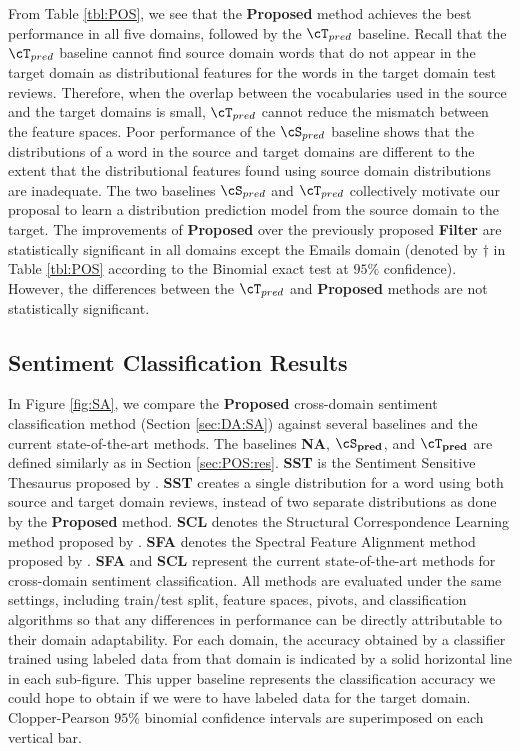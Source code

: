 \documentclass[11pt]{article}
\begin{document}
From Table \ref{tbl:POS}, we see that the \textbf{Proposed} method achieves the best performance in all five domains,
followed by the $\cT_{pred}$ baseline. 
Recall that the $\cT_{pred}$ baseline cannot find source domain words that do not appear in the target domain
as distributional features for the words in the target domain test reviews. Therefore, when the overlap between 
the vocabularies used in the source and the target domains is small, $\cT_{pred}$ cannot reduce the mismatch between the feature spaces.
Poor performance of the $\cS_{pred}$ baseline shows that the distributions of a word in the source and target domains
are different to the extent that the distributional features found using source domain distributions are inadequate.
The two baselines $\cS_{pred}$ and $\cT_{pred}$ collectively motivate our
proposal to learn a distribution prediction model from the source domain to the target.
The improvements of \textbf{Proposed}  over the previously proposed
\textbf{Filter} are statistically significant in all domains except the Emails domain (denoted by $\dagger$
in Table \ref{tbl:POS} according to the Binomial exact test at $95\%$ confidence). 
However, the differences between the $\cT_{pred}$ and
\textbf{Proposed} methods are not statistically significant.

\subsection{Sentiment Classification Results}
\label{sec:SA:res}

In Figure \ref{fig:SA}, we compare the \textbf{Proposed} 
cross-domain sentiment classification method (Section \ref{sec:DA:SA})
against several baselines and the current state-of-the-art methods.
The baselines \textbf{NA}, $\mathbf{\cS_{pred}}$, 
and $\mathbf{\cT_{pred}}$ are defined similarly as in Section \ref{sec:POS:res}.
\textbf{SST} is the Sentiment Sensitive Thesaurus proposed by . 
\textbf{SST} creates a single distribution for a word using both source and target domain reviews,
instead of two separate distributions as done by the \textbf{Proposed} method.
\textbf{SCL} denotes the Structural Correspondence Learning method proposed by .
\textbf{SFA} denotes the Spectral Feature Alignment 
method proposed by .
\textbf{SFA} and \textbf{SCL} represent  the current state-of-the-art methods for 
cross-domain sentiment classification.
All methods are evaluated under the same settings, including train/test split, feature spaces, pivots, and classification algorithms
so that any differences in performance can be directly attributable to their domain adaptability.
For each domain, the accuracy obtained by a classifier trained using labeled data from that domain
is indicated by a solid horizontal line in each sub-figure. This upper baseline represents the classification
accuracy we could hope to obtain if we were to have labeled data for the target domain.
Clopper-Pearson $95\%$ binomial confidence intervals are superimposed on each vertical bar.
\end{document}
